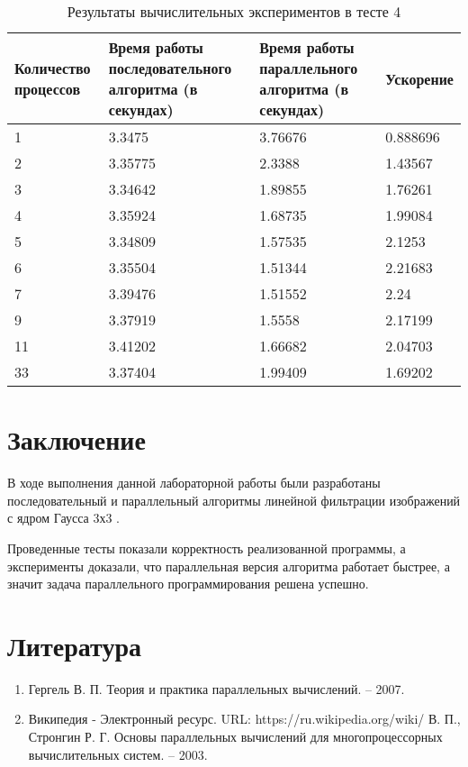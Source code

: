 \documentclass{report}
\begin{document}
\begin{table}[!h]
\caption{Результаты вычислительных экспериментов в тесте 4}
\centering
\begin{tabular}{| p{2cm} | p{3cm} | p{4cm} | p{2cm} |}
\hline
Количество процессов & Время работы последовательного алгоритма (в секундах) & Время работы параллельного алгоритма (в секундах) & Ускорение  \\[5pt]
\hline
1        & 3.3475        & 3.76676     & 0.888696       \\
2        & 3.35775        & 2.3388     & 1.43567       \\
3        & 3.34642        & 1.89855     & 1.76261       \\
4        & 3.35924        & 1.68735     & 1.99084       \\
5        & 3.34809        & 1.57535     & 2.1253       \\
6        & 3.35504        & 1.51344     & 2.21683       \\
7        & 3.39476        & 1.51552     & 2.24       \\
9        & 3.37919        & 1.5558     & 2.17199	    \\
11        & 3.41202        & 1.66682     & 2.04703	  \\
33        & 3.37404        & 1.99409     & 1.69202	  \\
\hline
\end{tabular}
\end{table}



\newpage

\section*{Заключение}
В ходе выполнения  данной лабораторной работы были разработаны последовательный и параллельный алгоритмы  линейной фильтрации изображений с ядром Гаусса 3х3 .
\par Проведенные тесты показали корректность реализованной программы, а  эксперименты доказали, что параллельная версия алгоритма работает быстрее, а значит задача параллельного программирования решена успешно.
\newpage

\section*{Литература}
\begin{enumerate}

\item Гергель В. П. Теория и практика параллельных вычислений. – 2007. 
\item Википедия - Электронный ресурс. URL: https://ru.wikipedia.org/wiki/%
 В. П., Стронгин Р. Г. Основы параллельных вычислений для многопроцессорных вычислительных систем. – 2003.
\end{enumerate} 
\newpage
\end{document}
